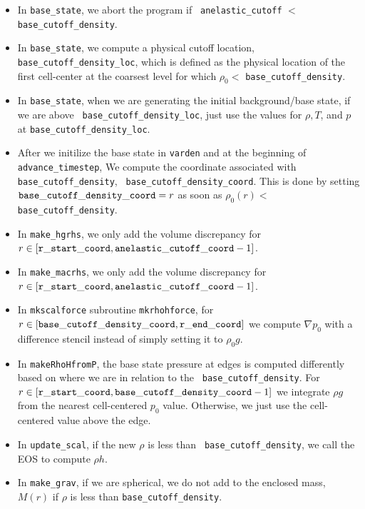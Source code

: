 \begin{itemize}

\item In {\tt base\_state}, we abort the program if {\tt
  anelastic\_cutoff} $<$ {\tt base\_cutoff\_density}.

\item In {\tt base\_state}, we compute a physical cutoff location,
  {\tt base\_cutoff\_density\_loc}, which is defined as the physical
  location of the first cell-center at the coarsest level for which
  $\rho_0 <$ {\tt base\_cutoff\_density}.

\item In {\tt base\_state}, when we are generating the initial
  background/base state, if we are above {\tt
    base\_cutoff\_density\_loc}, just use the values for $\rho,T$, and
  $p$ at {\tt base\_cutoff\_density\_loc}.

\item After we initilize the base state in {\tt varden} and at the
  beginning of {\tt advance\_timestep}, We compute the coordinate
  associated with {\tt base\_cutoff\_density}, {\tt
    base\_cutoff\_density\_coord}.  This is done by setting ${\tt
    base\_cutoff\_density\_coord}= r$ as soon as $\rho_0(r) <$ {\tt
    base\_cutoff\_density}.

\item In {\tt make\_hgrhs}, we only add the volume discrepancy for
  $r\in[{\tt r\_start\_coord},{\tt anelastic\_cutoff\_coord}-1]$.

\item In {\tt make\_macrhs}, we only add the volume discrepancy for
  $r\in[{\tt r\_start\_coord},{\tt anelastic\_cutoff\_coord}-1]$.

\item In {\tt mkscalforce} subroutine {\tt mkrhohforce}, for
  $r\in[{\tt base\_cutoff\_density\_coord},{\tt r\_end\_coord}]$ we
  compute $\nabla p_0$ with a difference stencil instead of simply
  setting it to $\rho_0 g$.

\item In {\tt makeRhoHfromP}, the base state pressure at edges is
  computed differently based on where we are in relation to the {\tt
    base\_cutoff\_density}.  For $r\in[{\tt r\_start\_coord},{\tt
      base\_cutoff\_density\_coord}-1]$ we integrate $\rho g$ from the
  nearest cell-centered $p_0$ value.  Otherwise, we just use the
  cell-centered value above the edge.

\item In {\tt update\_scal}, if the new $\rho$ is less than {\tt
  base\_cutoff\_density}, we call the EOS to compute $\rho h$.

\item In {\tt make\_grav}, if we are spherical, we do not add to the
  enclosed mass, $M(r)$ if $\rho$ is less than {\tt base\_cutoff\_density}.
\end{itemize}


